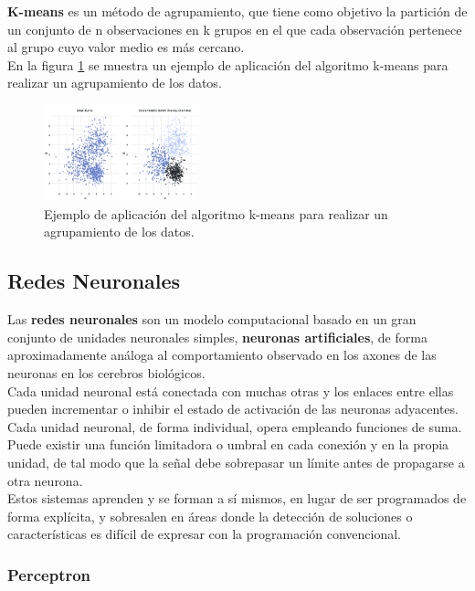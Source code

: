 \documentclass[osajnl,twocolumn,showpacs,superscriptaddress,10pt,floatfix]{revtex4-1} %
\begin{document}
\textbf{K-means} es un método de agrupamiento, que tiene como objetivo la partición de un conjunto de n observaciones en k grupos en el que cada observación pertenece al grupo cuyo valor medio es más cercano. \\

En la figura \ref{figure:clustering_example} se muestra un ejemplo de aplicación del algoritmo k-means para realizar un agrupamiento de los datos.

\begin{figure}[H]
    \centering
    \includegraphics[width=0.4\textwidth]{theory/clustering}
    \caption{Ejemplo de aplicación del algoritmo k-means para realizar un agrupamiento de los datos.}
    \label{figure:clustering_example}
\end{figure}

\subsection{Redes Neuronales}

Las \textbf{redes neuronales} son un modelo computacional basado en un gran conjunto de unidades neuronales simples, \textbf{neuronas artificiales}, de forma aproximadamente análoga al comportamiento observado en los axones de las neuronas en los cerebros biológicos. \\

Cada unidad neuronal está conectada con muchas otras y los enlaces entre ellas pueden incrementar o inhibir el estado de activación de las neuronas adyacentes. Cada unidad neuronal, de forma individual, opera empleando funciones de suma. Puede existir una función limitadora o umbral en cada conexión y en la propia unidad, de tal modo que la señal debe sobrepasar un límite antes de propagarse a otra neurona. \\

Estos sistemas aprenden y se forman a sí mismos, en lugar de ser programados de forma explícita, y sobresalen en áreas donde la detección de soluciones o características es difícil de expresar con la programación convencional.

\subsubsection{Perceptron}
\end{document}
